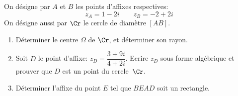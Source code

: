 \begin{exercice}
On d\'esigne par $A$ et $B$ les points d'affixes respectives:
\[ z_A=1-2i \qquad z_B=-2+2i \]
On d\'esigne aussi par $\Cr$ le cercle de diam\`etre $[AB]$.
\begin{enumerate}
\item D\'eterminer le centre $\Omega$ de $\Cr$, et d\'eterminer son rayon.
\item Soit $D$  le point d'affixe: $z_D=\dfrac{3+9i}{4+2i}$. Ecrire $z_D$
  sous forme alg\'ebrique et prouver que $D$ est un point du cercle~$\Cr$.
\item D\'eterminer l'affixe du point $E$ tel que $BEAD$ soit un rectangle.
\end{enumerate}
 
\end{exercice}
